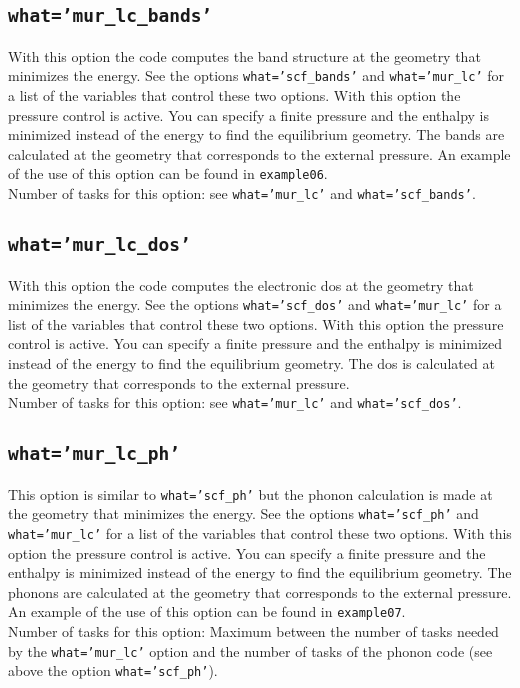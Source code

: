 \documentclass[12pt,a4paper]{article}
\begin{document}
\subsection{\color{web-blue}\texttt{what='mur\_lc\_bands'}}
With this option the code computes the band structure at the geometry 
that minimizes the energy. See the options 
\texttt{what='scf\_bands'} and \texttt{what='mur\_lc'} for a list of 
the variables that control these two options. 
With this option the pressure control is active. You can specify a
finite pressure and the enthalpy is minimized instead of the
energy to find the equilibrium geometry. The bands are calculated
at the geometry that corresponds to the external pressure.
An example of the use of this option can be found in \texttt{example06}. \\
Number of tasks for this option: see \texttt{what='mur\_lc'} and
\texttt{what='scf\_bands'}.

\subsection{\color{web-blue}\texttt{what='mur\_lc\_dos'}}
With this option the code computes the electronic dos at the geometry 
that minimizes the energy. See the options 
\texttt{what='scf\_dos'} and \texttt{what='mur\_lc'} for a list of 
the variables that control these two options. 
With this option the pressure control is active. You can specify a
finite pressure and the enthalpy is minimized instead of the
energy to find the equilibrium geometry. The dos is calculated
at the geometry that corresponds to the external pressure. \\
Number of tasks for this option: see \texttt{what='mur\_lc'} and 
\texttt{what='scf\_dos'}.

\subsection{\color{web-blue}\texttt{what='mur\_lc\_ph'}}
This option is similar to \texttt{what='scf\_ph'} but the phonon calculation
is made at the geometry that minimizes the energy.
See the options \texttt{what='scf\_ph'} and \texttt{what='mur\_lc'} for a
list of the variables that control these two options. 
With this option the pressure control is active. You can specify a
finite pressure and the enthalpy is minimized instead of the
energy to find the equilibrium geometry. The phonons are calculated
at the geometry that corresponds to the external pressure.
An example of the use of this option can be found in \texttt{example07}. \\
Number of tasks for this option: Maximum between the number of tasks 
needed by the \texttt{what='mur\_lc'} option and the number
of tasks of the phonon code (see above the option \texttt{what='scf\_ph'}).
\end{document}
